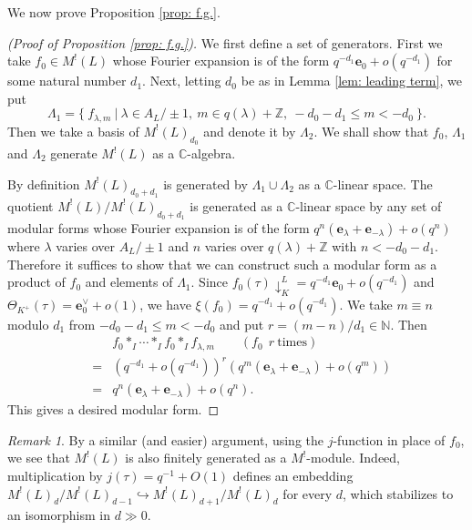 \documentclass[12pt]{amsart}
\numberwithin{equation}{section}
\theoremstyle{definition}
\theoremstyle{remark}
\newtheorem{remark}[theorem]{Remark}
\newcommand{\N}{\mathbb{N}}
\newcommand{\Z}{\mathbb{Z}}
\newcommand{\C}{\mathbb{C}}
\newcommand{\elambda}{{\mathbf e}_{\lambda}}
\newcommand{\pushLK}{\downarrow^{L}_{K}}
\newcommand{\ThetaK}{\Theta_{K^{+}}}
\newcommand{\ML}{M^{!}(L)}
\begin{document}
We now prove Proposition \ref{prop: f.g.}. 

\begin{proof}[(Proof of Proposition \ref{prop: f.g.})]
We first define a set of generators. 
First we take $f_{0}\in{\ML}$ whose Fourier expansion is of the form 
$q^{-d_{1}}\mathbf{e}_{0}+o(q^{-d_{1}})$ for some natural number $d_{1}$. 
Next, 
letting $d_{0}$ be as in Lemma \ref{lem: leading term}, 
we put  
\begin{equation*}
\Lambda_{1} = 
\{ \: f_{\lambda,m} \: | \: \lambda\in A_{L}/\pm 1, \: m\in q(\lambda)+{\Z}, \: -d_{0}-d_{1} \leq m < -d_{0} \: \}. 
\end{equation*}
Then we take a basis of $M^{!}(L)_{d_{0}}$ and denote it by $\Lambda_{2}$. 
We shall show that $f_{0}$, $\Lambda_{1}$ and $\Lambda_{2}$ 
generate ${\ML}$ as a ${\C}$-algebra. 

By definition $M^{!}(L)_{d_{0}+d_{1}}$ is generated by 
$\Lambda_{1}\cup \Lambda_{2}$ as a ${\C}$-linear space. 
The quotient 
$M^!(L)/M^!(L)_{d_0+d_1}$ 
is generated as a ${\C}$-linear space 
by any set of modular forms whose Fourier expansion is of the form 
$q^{n}({\elambda}+\mathbf{e}_{-\lambda})+o(q^{n})$ 
where $\lambda$ varies over $A_{L}/\pm 1$ and 
$n$ varies over  $q(\lambda)+{\Z}$ with $n<-d_{0}-d_{1}$. 
Therefore it suffices to show that 
we can construct such a modular form as a product of $f_{0}$ and elements of $\Lambda_{1}$. 
Since 
$f_{0}(\tau){\pushLK}=q^{-d_1}\mathbf{e}_{0}+o(q^{-d_1})$ 
and 
${\ThetaK}(\tau)=\mathbf{e}_{0}^{\vee}+o(1)$, 
we have 
$\xi(f_0)=q^{-d_1}+o(q^{-d_1})$. 
We take 
$m\equiv n$ modulo $d_1$ from 
$-d_0-d_1 \leq m < -d_0$ 
and put 
$r=(m-n)/d_1\in {\N}$. 
Then 
\begin{eqnarray*}
& & 
f_{0} \ast_{I} \cdots \ast_{I} f_{0} \ast_{I} f_{\lambda,m} \qquad (f_{0} \: \: r \: \textrm{times}) \\ 
& = & 
(q^{-d_1}+o(q^{-d_1}))^{r} (q^{m}({\elambda}+\mathbf{e}_{-\lambda})+o(q^{m})) \\ 
& = & 
q^{n}({\elambda}+\mathbf{e}_{-\lambda}) + o(q^{n}). 
\end{eqnarray*}
This gives a desired modular form. 
\end{proof}


\begin{remark}\label{remark: f.g. as module}
By a similar (and easier) argument, 
using the $j$-function in place of $f_{0}$, 
we see that ${\ML}$ is also finitely generated as a $M^!$-module. 
Indeed, 
multiplication by $j(\tau)=q^{-1}+O(1)$ defines an embedding 
$M^{!}(L)_{d}/M^{!}(L)_{d-1}\hookrightarrow M^!(L)_{d+1}/M^!(L)_{d}$ 
for every $d$, 
which stabilizes to an isomorphism in $d \gg 0$. 
\end{remark} 
\end{document}

